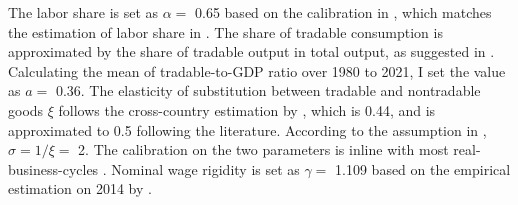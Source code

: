 The labor share is set as $\alpha=$ 0.65 based on the calibration in \citet*{Jegajeevan-Sri-Lanka-DSGE}, which matches the estimation of labor share in \citet{duma2007sri}. The share of tradable consumption is approximated by the share of tradable output in total output, as suggested in \citet{Uribe-Schmitt-Grohe-textbook}. Calculating the mean of tradable-to-GDP ratio over 1980 to 2021, I set the value as $a =$ 0.36. The elasticity of substitution between tradable and nontradable goods $\xi$ follows the cross-country estimation by \citet*{Stockman-Tesar-95}, which is 0.44, and is approximated to 0.5 following the literature. According to the assumption in , $\sigma=1/\xi=$ 2. The calibration on the two parameters is inline with most real-business-cycles \citep{Uribe-Schmitt-Grohe-textbook,Na-18}. Nominal wage rigidity is set as $\gamma=$ 1.109 based on the empirical estimation on 2014 by \citet*{wage-rigidity-data}.

